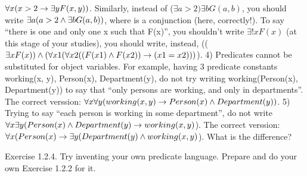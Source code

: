 \(\forall x(x>2\rightarrow \exists yF(x,y))\). Similarly, instead of (\(\exists a>2)\exists bG(a,b)\), you should write \(\exists a(a>2\wedge \exists bG(a,b))\), where
\AND  is a conjunction (here, correctly!).
To say ``there is one and only one x such that F(x)'', you shouldn't write \(\exists !x F(x)\) (at this stage of your
studies), you should write, instead, ((\(\exists xF(x))\wedge (\forall x1(\forall x2((F(x1)\wedge F(x2))\rightarrow (x1=x2)))\)).
4) Predicates cannot be substituted for object variables. For example, having 3 predicate constants
working(x, y), Person(x), Department(y), do not try writing working(Person(x), Department(y)) to say
that ``only persons are working, and only in departments''. The correct verssion: \(\forall x\forall y(working(x, y)\rightarrow Person(x)\wedge Department(y))\).
5) Trying to say ``each person is working in some department'', do not write
\(\forall x\exists y(Person(x)\wedge Department(y)\rightarrow working(x,y)\)). The correct verssion:
\(\forall x(Person(x)\rightarrow \exists y(Department(y)\wedge working(x,y)\)). What is the difference?

Exercise 1.2.4. Try inventing your own predicate language. Prepare and do your own Exercise 1.2.2 for it.

